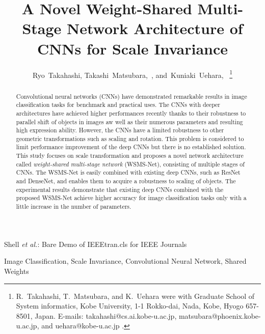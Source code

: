 \documentclass[journal]{IEEEtran}
\begin{document}
\title{A Novel Weight-Shared Multi-Stage Network Architecture of CNNs for Scale Invariance}
\author{Ryo~Takahashi,
        Takashi~Matsubara,~,
        and~Kuniaki~Uehara,~%
\thanks{R.~Takahashi, T.~Matsubara, and K.~Uehara were with Graduate School of System informatics, Kobe University, 1-1 Rokko-dai, Nada, Kobe, Hyogo 657-8501, Japan. E-mails: takahashi@cs.ai.kobe-u.ac.jp, matsubara@phoenix.kobe-u.ac.jp, and uehara@kobe-u.ac.jp
.}
}
%
{Shell \MakeLowercase{\textit{et al.}}: Bare Demo of IEEEtran.cls for IEEE Journals}

\maketitle

\begin{abstract}
Convolutional neural networks (CNNs) have demonstrated remarkable results in image classification tasks for benchmark and practical uses.
The CNNs with deeper architectures have achieved higher performances recently thanks to their robustness to parallel shift of objects in images aw well as their numerous parameters and resulting high expression ability.
However, the CNNs have a limited robustness to other geometric transformations such as scaling and rotation.
This problem is considered to limit performance improvement of the deep CNNs but there is no established solution.
This study focuses on scale transformation and proposes a novel network architecture called \emph{weight-shared multi-stage network} (WSMS-Net), consisting of multiple stages of CNNs.
The WSMS-Net is easily combined with existing deep CNNs, such as ResNet and DenseNet, and enables them to acquire a robustness to scaling of objects.
The experimental results demonstrate that existing deep CNNs combined with the proposed WSMS-Net achieve higher accuracy for image classification tasks only with a little increase in the number of parameters.
\end{abstract}

\begin{IEEEkeywords}
Image Classification, Scale Invariance, Convolutional Neural Network, Shared Weights
\end{IEEEkeywords}


\IEEEpeerreviewmaketitle
\end{document}

